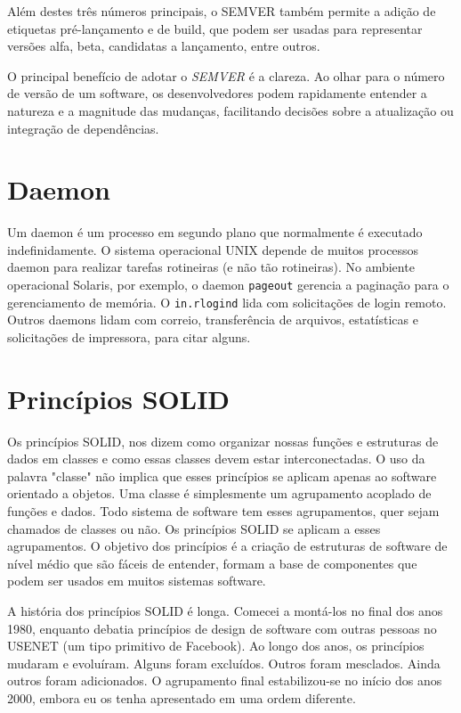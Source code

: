 \documentclass[12pt, %
openright, 
oneside, %
a4paper,    %
brazil]{facom-ufu-abntex2}
\begin{document}
Além destes três números principais, o SEMVER também permite a adição de
etiquetas pré-lançamento e de build, que podem ser usadas para representar
versões alfa, beta, candidatas a lançamento, entre outros.

O principal benefício de adotar o \textit{SEMVER} é a clareza. Ao olhar para o
número de versão de um software, os desenvolvedores podem rapidamente entender
a natureza e a magnitude das mudanças, facilitando decisões sobre a atualização
ou integração de dependências. \cite{semver}

\section{Daemon}

Um daemon é um processo em segundo plano que normalmente é executado
indefinidamente. O sistema operacional UNIX depende de muitos processos daemon
para realizar tarefas rotineiras (e não tão rotineiras). No ambiente
operacional Solaris, por exemplo, o daemon \texttt{pageout} gerencia a
paginação para o gerenciamento de memória. O \texttt{in.rlogind} lida com
solicitações de login remoto. Outros daemons lidam com correio, transferência
de arquivos, estatísticas e solicitações de impressora, para citar alguns.
\cite{kay2004unix}

\section{Princípios SOLID}

Os princípios SOLID, nos dizem como organizar nossas funções e estruturas de
dados em classes e como essas classes devem estar interconectadas. O uso da
palavra "classe" não implica que esses princípios se aplicam apenas ao software
orientado a objetos. Uma classe é simplesmente um agrupamento acoplado de
funções e dados. Todo sistema de software tem esses agrupamentos, quer sejam
chamados de classes ou não. Os princípios SOLID se aplicam a esses
agrupamentos. O objetivo dos princípios é a criação de estruturas de software
de nível médio que são fáceis de entender, formam a base de componentes que
podem ser usados em muitos sistemas software.

A história dos princípios SOLID é longa. Comecei a montá-los no final dos anos
1980, enquanto debatia princípios de design de software com outras pessoas no
USENET (um tipo primitivo de Facebook). Ao longo dos anos, os princípios
mudaram e evoluíram. Alguns foram excluídos. Outros foram mesclados. Ainda
outros foram adicionados. O agrupamento final estabilizou-se no início dos anos
2000, embora eu os tenha apresentado em uma ordem diferente.
\end{document}
